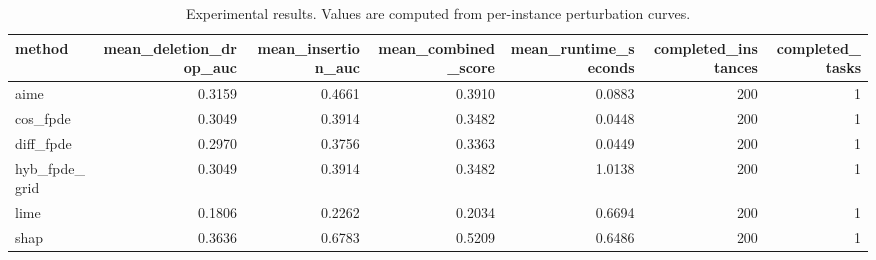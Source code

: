 \begin{table}[t]
\caption{Experimental results. Values are computed from per-instance perturbation curves.}
\label{tab:main_results_computed}
\centering
\begin{tabular}{lrrrrrr}
\toprule
method & mean\_deletion\_drop\_auc & mean\_insertion\_auc & mean\_combined\_score & mean\_runtime\_seconds & completed\_instances & completed\_tasks \\
\midrule
aime & 0.3159 & 0.4661 & 0.3910 & 0.0883 & 200 & 1 \\
cos\_fpde & 0.3049 & 0.3914 & 0.3482 & 0.0448 & 200 & 1 \\
diff\_fpde & 0.2970 & 0.3756 & 0.3363 & 0.0449 & 200 & 1 \\
hyb\_fpde\_grid & 0.3049 & 0.3914 & 0.3482 & 1.0138 & 200 & 1 \\
lime & 0.1806 & 0.2262 & 0.2034 & 0.6694 & 200 & 1 \\
shap & 0.3636 & 0.6783 & 0.5209 & 0.6486 & 200 & 1 \\
\bottomrule
\end{tabular}

\end{table}
